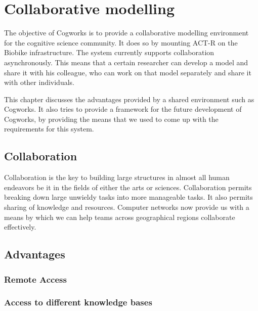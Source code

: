 
\chapter{Collaborative modelling}
\label{chap-four}


The objective of Cogworks is to provide a collaborative modelling
environment for the cognitive science community. It does so by
mounting ACT-R on the Biobike infrastructure. The system currently
supports collaboration asynchronously. This means that a certain
researcher can develop a model and share it with his colleague, who
can work on that model separately and share it with other individuals.

This chapter discusses the advantages provided by a shared environment
such as Cogworks. It also tries to provide a framework for the future
development of Cogworks, by providing the means that we used to come
up with the requirements for this system.

\section{Collaboration}

Collaboration is the key to building large structures in almost all
human endeavors be it in the fields of either the arts or
sciences. Collaboration permits breaking down large unwieldy tasks
into more manageable tasks. It also permits sharing of knowledge and
resources. Computer networks now provide us with a means by which we
can help teams across geographical regions collaborate effectively.



\section{Advantages}

\subsection{Remote Access}

\subsection{Access to different knowledge bases}

